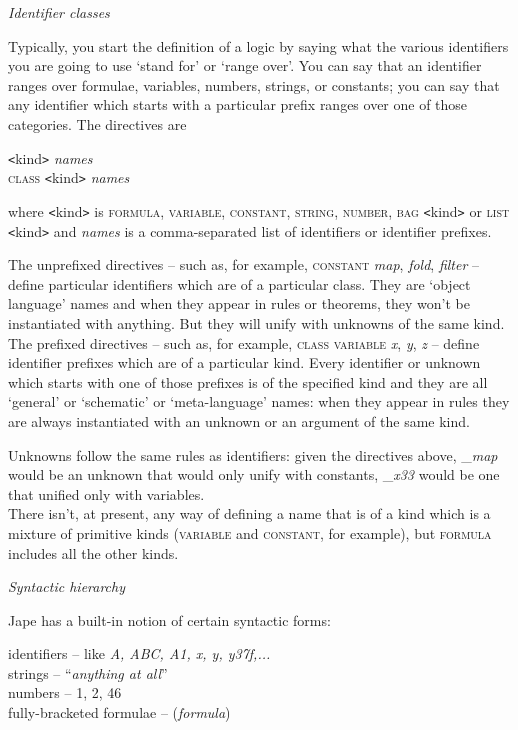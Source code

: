 \documentclass[11pt]{book}
\newcommand{\tab}{\hspace{5mm}}
\begin{document}
\textit{Identifier classes}


Typically, you start the definition of a logic by saying what the various identifiers you are going to use `stand for' or `range over'. You can say that an identifier ranges over formulae, variables, numbers, strings, or constants; you can say that any identifier which starts with a particular prefix ranges over one of those categories. The directives are

\texttt{<}kind\texttt{>} \textit{names}\\
\textsc{class} \texttt{<}kind\texttt{>} \textit{names}


where \texttt{<}kind\texttt{>} is \textsc{formula, variable}, \textsc{constant, string}, \textsc{number}, \textsc{bag} \texttt{<}kind\texttt{>} or \textsc{list} \texttt{<}kind\texttt{>} and \textit{names} is a comma-separated list of identifiers or identifier prefixes.


The unprefixed directives -- such as, for example, \textsc{constant} \textit{map}, \textit{fold}, \textit{filter} -- define particular identifiers which are of a particular class. They are `object language' names and when they appear in rules or theorems, they won't be instantiated with anything. But they will unify with unknowns of the same kind.\\
The prefixed directives -- such as, for example, \textsc{class variable} \textit{x}, \textit{y}, \textit{z} -- define identifier prefixes which are of a particular kind. Every identifier or unknown which starts with one of those prefixes is of the specified kind and they are all `general' or `schematic' or `meta-language' names: when they appear in rules they are always instantiated with an unknown or an argument of the same kind.


Unknowns follow the same rules as identifiers: given the directives above, \_\textit{map} would be an unknown that would only unify with constants, \_\textit{x33} would be one that unified only with variables.\\
There isn't, at present, any way of defining a name that is of a kind which is a mixture of primitive kinds (\textsc{variable} and \textsc{constant}, for example), but \textsc{formula} includes all the other kinds.


\textit{Syntactic hierarchy}


Jape has a built-in notion of certain syntactic forms:


{\textbullet}\tab identifiers -- like \textit{A, ABC, A1, x, y, y37f,...} \\
{\textbullet}\tab strings -- ``\textit{anything at all}'' \\
{\textbullet}\tab numbers -- 1, 2, 46 \\
{\textbullet}\tab fully-bracketed formulae -- (\textit{formula})
\end{document}
